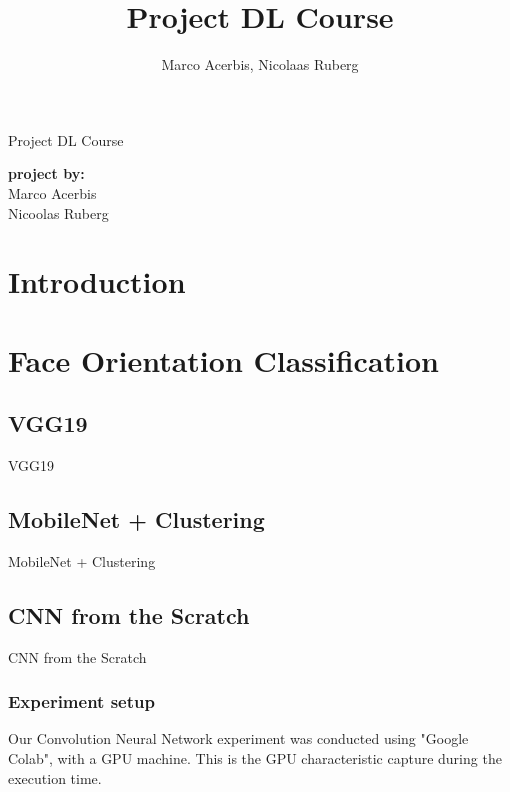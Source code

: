 \documentclass[oneside]{book}
\begin{document}
\begin{titlepage}
\title{Project DL Course}
\author{Marco Acerbis, Nicolaas Ruberg}

\begin{Huge}
\begin{center}
Project DL Course
\end{center}
\end{Huge}

\begin{large}
\begin{minipage}{2in}
\textbf{project by:} \\
Marco Acerbis \\
Nicoolas Ruberg
\end{minipage}
\hfill
\end{large}

\end{titlepage}

\tableofcontents

\chapter*{Introduction}

\chapter{Face Orientation Classification}
\section{VGG19}
VGG19

\section{MobileNet + Clustering}
MobileNet + Clustering

\section{CNN from the Scratch}
CNN from the Scratch

\subsection{Experiment setup}
Our Convolution Neural Network experiment was conducted using "Google Colab", with a GPU machine.
This is the GPU characteristic capture during the execution time.
\end{document}
